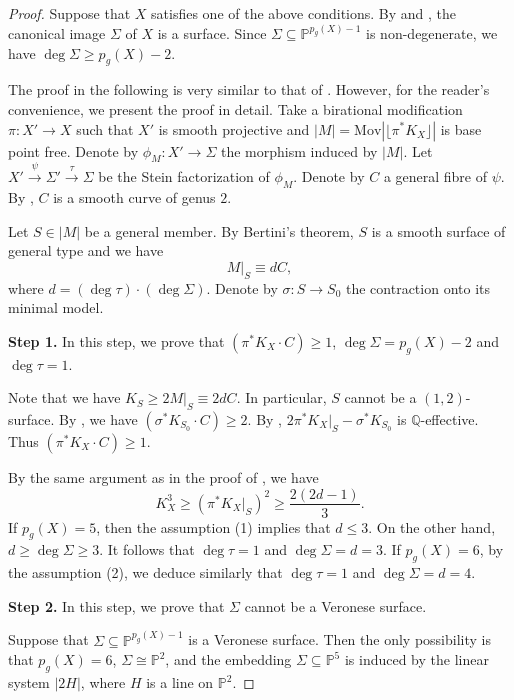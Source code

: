 \documentclass[a4paper,11pt]{amsart}
\newcommand{\rounddown}[1]{\lfloor{#1}\rfloor}
\newcommand{\PP}{\ensuremath{\mathbb{P}}}
\newcommand{\QQ}{\ensuremath{\mathbb{Q}}}
\theoremstyle{definition}
\theoremstyle{remark}
\numberwithin{equation}{section}
\begin{document}
\begin{proof}
    Suppose that $X$ satisfies one of the above conditions. By \cite[Theorem 2.4]{Kobayashi} and \cite[Theorem 4.6]{CHJ}, the canonical image $\Sigma$ of $X$ is a surface. Since $\Sigma \subseteq \PP^{p_g(X)-1}$ is non-degenerate, we have $\deg \Sigma \geq p_g(X)-2$.

    The proof in the following is very similar to that of \cite[Proposition 2.1]{HZ}. However, for the reader's convenience, we present the proof in detail. Take a birational modification $\pi: X' \to X$ such that $X'$ is smooth projective and $|M| = \mathrm{Mov}|\rounddown{\pi^*K_X}|$ is base point free. Denote by $\phi_M: X' \to \Sigma$ the morphism induced by $|M|$. Let $X' \stackrel {\psi}\rightarrow \Sigma' \stackrel{\tau} \rightarrow \Sigma$ be the Stein factorization of $\phi_M$. Denote by $C$ a general fibre of $\psi$. By \cite[Theorem 4.1]{CCJ}, $C$ is a smooth curve of genus $2$.

    Let $S \in |M|$ be a general member. By Bertini's theorem, $S$ is a smooth surface of general type and we have
    $$
    M|_S \equiv dC,
    $$
    where $d = (\deg\tau) \cdot (\deg\Sigma)$. Denote by $\sigma: S \to S_0$ the contraction onto its minimal model. 

    \textbf{Step 1.} In this step, we prove that $(\pi^*K_X \cdot C) \geq 1$, $\deg \Sigma = p_g(X) - 2$ and $\deg\tau=1$. 
    
    Note that we have $K_S \geq 2M|_S \equiv 2d C$. In particular, $S$ cannot be a $(1,2)$-surface. By \cite[Lemma 2.4]{CC}, we have $(\sigma^*K_{S_0} \cdot C)\geq 2$. By \cite[Corollary 2.3]{CCJ}, $2\pi^*K_X|_S-\sigma^*K_{S_0}$ is $\QQ$-effective. Thus $(\pi^*K_X \cdot C) \geq 1$.
    
    By the same argument as in the proof of \cite[Theorem 4.2]{CCJ}, we have
    $$
    K_X^3 \geq (\pi^*K_X|_S)^2 \geq \frac{2(2d-1)}{3}.
    $$
    If $p_g(X)=5$, then the assumption (1) implies that $d \le 3$. On the other hand, $d \ge \deg \Sigma \ge 3$. It follows that $\deg \tau = 1$ and $\deg \Sigma = d = 3$. If $p_g(X) = 6$, by the assumption (2), we deduce similarly that $\deg \tau = 1$ and $\deg \Sigma = d = 4$.

    \textbf{Step 2.} In this step, we prove that $\Sigma$ cannot be a Veronese surface. 

    Suppose that $\Sigma \subseteq \PP^{p_g(X)-1}$ is a Veronese surface. Then the only possibility is that $p_g(X)=6$, $\Sigma \cong \PP^2$, and the embedding $\Sigma \subseteq \PP^5$ is induced by the linear system $|2H|$, where $H$ is a line on $\PP^2$. 


\end{proof}
\end{document}
